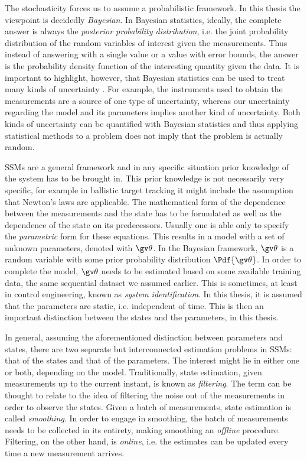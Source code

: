 The stochasticity forces us to assume a probabilistic framework. In this thesis the viewpoint
is decidedly \emph{Bayesian}. In Bayesian statistics, ideally, the complete answer
is always the \emph{posterior probability distribution}, i.e. the joint probability distribution
of the random variables of interest given the measurements. Thus instead of answering
with a single value or a value with error bounds, the answer is the probability
density function of the interesting quantity given the data. It is important to highlight,
however, that Bayesian statistics can be used to treat many kinds of uncertainty
\parencite[as pointed out in e.g.][]{Sarkka2012a}. For example, the instruments used 
to obtain the measurements are a source of one type of uncertainty, 
whereas our uncertainty regarding the model and its parameters implies
another kind of uncertainty. Both kinds of uncertainty can be quantified with Bayesian
statistics and thus applying statistical methods to a problem does not imply that the problem 
is actually random.

SSMs are a general framework and in any specific situation prior knowledge of the
system has to be brought in. This prior knowledge is not necessarily very specific,
for example in ballistic target tracking it might include the assumption that Newton's
laws are applicable. The mathematical form of the dependence
between the measurements and the state has to be formulated as well as the dependence
of the state on its predecessors. Usually one is able only to specify the 
\emph{parametric} form for these equations. This results in a model with a set
of unknown parameters, denoted with $\Th$. In the Bayesian framework, $\Th$ is
a random variable with some prior probability distribution $\Pdf{\Th}$.
In order to complete the model, $\Th$ needs to be estimated based on some available
training data, the same sequential dataset we assumed earlier. This is sometimes, at least
in control engineering, known as \emph{system identification}. In this thesis,
it is assumed that the parameters are static, i.e. independent of time. 
This is then an important distinction between the states and
the parameters, in this thesis.

In general, assuming the aforementioned distinction between parameters and states, there are two separate but
interconnected estimation problems in SSMs: that of the states and that of the parameters. 
The interest might lie in either one or both, depending on the model. Traditionally, state
estimation, given measurements up to the current instant, is known as \emph{filtering}.
The term can be thought to relate to the idea of filtering the noise out of the measurements
in order to observe the states. Given a batch of measurements, state estimation is called \emph{smoothing}.
In order to engage in smoothing, the batch of measurements needs to be collected in its entirety, 
making smoothing an \emph{offline} procedure. Filtering, on the other hand, is \emph{online}, 
i.e. the estimates can be updated every time a new measurement arrives.

